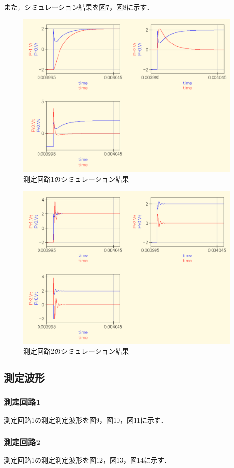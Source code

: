 \newpage

また，シミュレーション結果を図7，図8に示す．
\begin{figure}[H]
    \begin{center}
        \includegraphics[keepaspectratio, scale=0.475]{result1.pdf}
        \caption{測定回路1のシミュレーション結果}
    \end{center}
\end{figure}

\begin{figure}[H]
    \begin{center}
        \includegraphics[keepaspectratio, scale=0.475]{result2.pdf}
        \caption{測定回路2のシミュレーション結果}
    \end{center}
\end{figure}

\subsection{測定波形}
\subsubsection{測定回路1}
測定回路1の測定測定波形を図9，図10，図11に示す．

\subsubsection{測定回路2}
測定回路1の測定測定波形を図12，図13，図14に示す．
